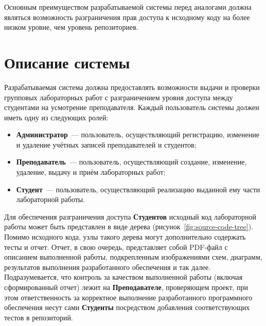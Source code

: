 \documentclass{bmstu}
\begin{document}
  Основным преимуществом разрабатываемой системы перед аналогами
  должна являться возможность разграничения прав доступа к исходному
  коду на более низком уровне, чем уровень репозиториев.

  \section{Описание системы}

  Разрабатываемая система должна предоставлять возможности выдачи и
  проверки групповых лабораторных работ с разграничением уровня
  доступа между студентами на усмотрение преподавателя.
  Каждый пользователь системы должен иметь одну из следующих ролей:
  \begin{itemize}[label=---]
    \item \textbf{Администратор}~--- пользователь, осуществляющий
      регистрацию, изменение и удаление учётных записей преподавателей
      и студентов;
    \item \textbf{Преподаватель}~--- пользователь, осуществляющий
      создание, изменение, удаление, выдачу и приём лабораторных
      работ;
    \item \textbf{Студент}~--- пользователь, осуществляющий реализацию
      выданной ему части лабораторной работы.
  \end{itemize}

  Для обеспечения разграничения доступа \textbf{Студентов} исходный код
  лабораторной работы может быть представлен в виде дерева
  (рисунок~\ref{fig:source-code-tree}).
  Помимо исходного кода, узлы такого дерева могут дополнительно содержать тесты
  и отчет.
  Отчет, в свою очередь, представляет собой PDF-файл с описанием выполненной
  работы, подкрепленным изображениями схем, диаграмм, результатов выполнения
  разработанного обеспечения и так далее.
  Подразумевается, что контроль за качеством выполненной работы (включая
  сформированный отчет) лежит на \textbf{Преподавателе}, проверяющем проект,
  при этом ответственность за корректное выполнение разработанного программного
  обеспечения несут сами \textbf{Студенты} посредством добавления
  соответствующих тестов в репозиторий.
\end{document}
